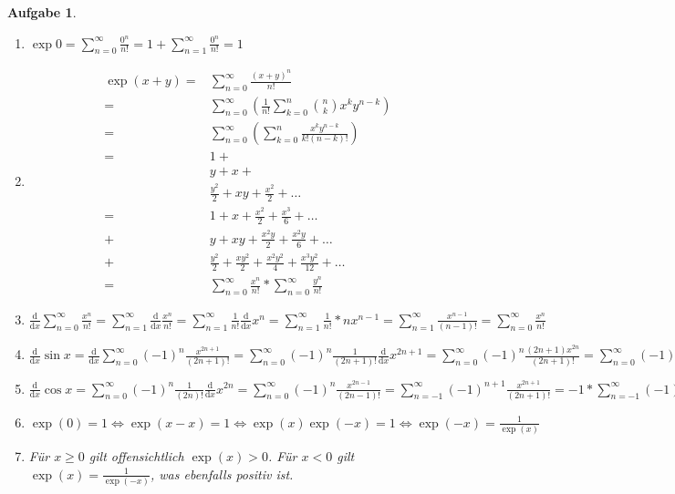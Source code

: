 \documentclass[a4paper,11pt,parskip=half,fleqn]{scrartcl}
\newcommand{\wrt}[1]{\mathrm{d}{#1}}
\newcommand{\diff}[1]{\frac{\mathrm{d}}{\wrt{#1}}}
\theoremstyle{note}
\newtheorem{aufgabe}{Aufgabe}
\begin{document}
\begin{aufgabe}
  \begin{enumerate}
    ~\item $\exp{0}=\sum\limits_{n=0}^\infty \frac{0^n}{n!}=1+\sum\limits_{n=1}^\infty \frac{0^n}{n!}=1$
    \item 
      \begin{align*}
	\exp(x+y)=&\sum\limits_{n=0}^\infty \frac{(x+y)^n}{n!} \\
	=&\sum\limits_{n=0}^\infty \left( \frac{1}{n!}\sum\limits_{k=0}^n \binom{n}{k}x^k y^{n-k} \right) \\
	=&\sum\limits_{n=0}^\infty \left( \sum\limits_{k=0}^n \frac{x^k y^{n-k}}{k!(n-k)!} \right) \\
	=&1+ \\
	&y+x+ \\
	&\frac{y^2}{2}+xy+\frac{x^2}{2}+\dots \\
	=&1+x+\frac{x^2}{2}+\frac{x^3}{6}+\dots \\
	+&y+xy+\frac{x^2y}{2}+\frac{x^2y}{6}+\dots \\
	+&\frac{y^2}{2}+\frac{xy^2}{2}+\frac{x^2y^2}{4}+\frac{x^3y^2}{12}+\dots \\
	=&\sum\limits_{n=0}^\infty \frac{x^n}{n!}*\sum\limits_{n=0}^\infty \frac{y^n}{n!}
      \end{align*}
    \item $\diff{x}\sum\limits_{n=0}^\infty \frac{x^n}{n!}=\sum\limits_{n=1}^\infty \diff{x} \frac{x^n}{n!}=\sum\limits_{n=1}^\infty \frac{1}{n!}
      \diff{x}x^n=\sum\limits_{n=1}^\infty \frac{1}{n!}*nx^{n-1}=\sum\limits_{n=1}^\infty \frac{x^{n-1}}{(n-1)!}=\sum\limits_{n=0}^\infty \frac{x^n}{n!}$
    \item $\diff{x}\sin x=\diff{x} \sum\limits_{n=0}^\infty (-1)^n \frac{x^{2n+1}}{(2n+1)!}=\sum\limits_{n=0}^\infty (-1)^n \frac{1}{(2n+1)!}\diff{x}x^{2n+1}
      =\sum\limits_{n=0}^\infty (-1)^n \frac{(2n+1)x^{2n}}{(2n+1)!}=\sum\limits_{n=0}^\infty (-1)^n \frac{x^{2n}}{(2n)!}=\cos x$
    \item $\diff{x}\cos x=\sum\limits_{n=0}^\infty (-1)^n \frac{1}{(2n)!}\diff{x}x^{2n}=\sum\limits_{n=0}^\infty (-1)^n \frac{x^{2n-1}}{(2n-1)!}=
      \sum\limits_{n=-1}^\infty (-1)^{n+1} \frac{x^{2n+1}}{(2n+1)!}=-1*\sum\limits_{n=-1}^\infty (-1)^n$
    \item $\exp(0)=1\iff\exp(x-x)=1\iff\exp(x)\exp(-x)=1\iff\exp(-x)=\frac{1}{\exp(x)}$
    \item Für $x\geq0$ gilt offensichtlich $\exp(x)>0$. Für $x<0$ gilt $\exp(x)=\frac{1}{\exp(-x)}$, was ebenfalls positiv ist.

\end{enumerate}
\end{aufgabe}
\end{document}
